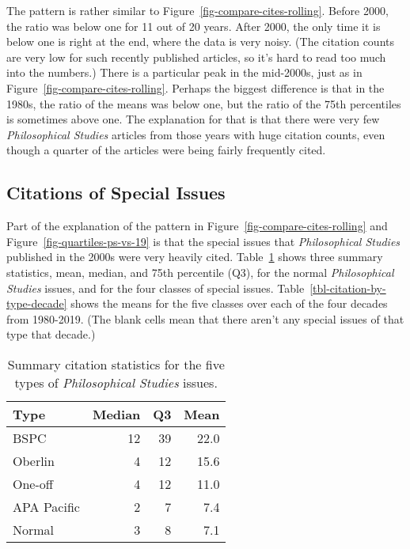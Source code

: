 \documentclass[
  10pt,
  letterpaper,
  DIV=11,
  numbers=noendperiod,
  twoside]{scrartcl}
\begin{document}
The pattern is rather similar to Figure~\ref{fig-compare-cites-rolling}.
Before 2000, the ratio was below one for 11 out of 20 years. After 2000,
the only time it is below one is right at the end, where the data is
very noisy. (The citation counts are very low for such recently
published articles, so it's hard to read too much into the numbers.)
There is a particular peak in the mid-2000s, just as in
Figure~\ref{fig-compare-cites-rolling}. Perhaps the biggest difference
is that in the 1980s, the ratio of the means was below one, but the
ratio of the 75th percentiles is sometimes above one. The explanation
for that is that there were very few \emph{Philosophical Studies}
articles from those years with huge citation counts, even though a
quarter of the articles were being fairly frequently cited.

\subsection{Citations of Special
Issues}\label{sec-citations-of-special-issues}

Part of the explanation of the pattern in
Figure~\ref{fig-compare-cites-rolling} and
Figure~\ref{fig-quartiles-ps-vs-19} is that the special issues that
\emph{Philosophical Studies} published in the 2000s were very heavily
cited. Table~\ref{tbl-citation-by-type} shows three summary statistics,
mean, median, and 75th percentile (Q3), for the normal
\emph{Philosophical Studies} issues, and for the four classes of special
issues. Table~\ref{tbl-citation-by-type-decade} shows the means for the
five classes over each of the four decades from 1980-2019. (The blank
cells mean that there aren't any special issues of that type that
decade.)

\begin{longtable}[]{@{}lrrr@{}}

\caption{\label{tbl-citation-by-type}Summary citation statistics for the
five types of \emph{Philosophical Studies} issues.}

\tabularnewline

\toprule\noalign{}
Type & Median & Q3 & Mean \\
\midrule\noalign{}
\endhead
\bottomrule\noalign{}
\endlastfoot
BSPC & 12 & 39 & 22.0 \\
Oberlin & 4 & 12 & 15.6 \\
One-off & 4 & 12 & 11.0 \\
APA Pacific & 2 & 7 & 7.4 \\
Normal & 3 & 8 & 7.1 \\

\end{longtable}
\end{document}
